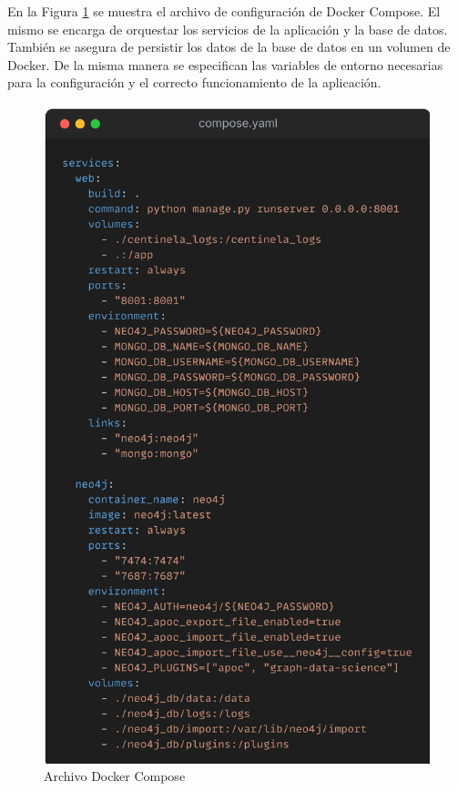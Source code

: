 En la Figura \ref{fig:docker-compose} se muestra el archivo de configuración de Docker Compose.
El mismo se encarga de orquestar los servicios de la aplicación y la base de datos. También se asegura de persistir los datos de la base de datos en un volumen de Docker.
De la misma manera se especifican las variables de entorno necesarias para la configuración y el correcto funcionamiento de la aplicación.

\begin{figure}[!t]
    \centering
    \includegraphics[scale=0.12]{../02Figures/02Chapter/Sprints/Sprint-3/compose-yaml.png}
    \caption{Archivo Docker Compose}
    \label{fig:docker-compose}
\end{figure}

